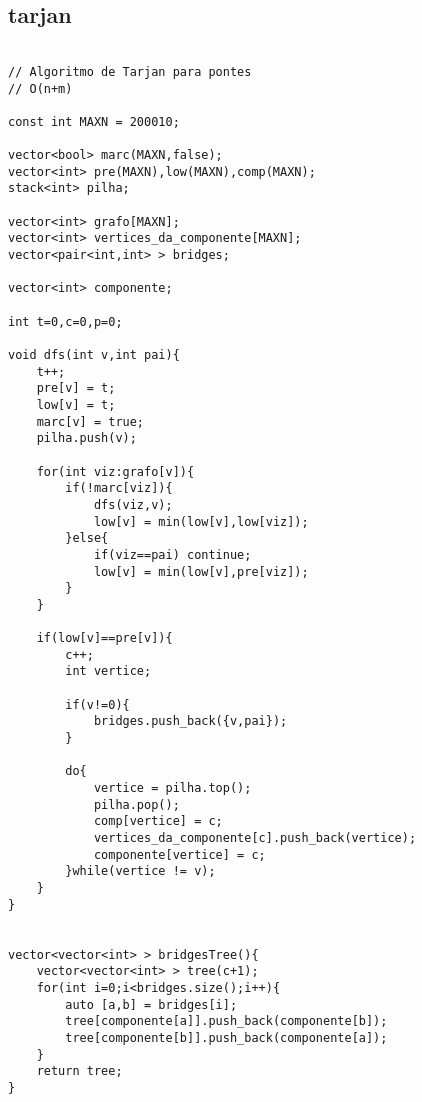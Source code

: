 \documentclass[landscape,twocolumn,10pt,a4paper]{article}
\begin{document}
\subsection{tarjan}
\begin{verbatim}

// Algoritmo de Tarjan para pontes
// O(n+m)

const int MAXN = 200010;

vector<bool> marc(MAXN,false);
vector<int> pre(MAXN),low(MAXN),comp(MAXN);
stack<int> pilha;

vector<int> grafo[MAXN];
vector<int> vertices_da_componente[MAXN];
vector<pair<int,int> > bridges;

vector<int> componente;

int t=0,c=0,p=0;

void dfs(int v,int pai){
    t++;
    pre[v] = t;
    low[v] = t;
    marc[v] = true;
    pilha.push(v);

    for(int viz:grafo[v]){
        if(!marc[viz]){
            dfs(viz,v);
            low[v] = min(low[v],low[viz]);
        }else{
            if(viz==pai) continue;
            low[v] = min(low[v],pre[viz]);
        }
    }

    if(low[v]==pre[v]){
        c++;
        int vertice;

        if(v!=0){
            bridges.push_back({v,pai});
        }

        do{
            vertice = pilha.top();
            pilha.pop();
            comp[vertice] = c;
            vertices_da_componente[c].push_back(vertice);
            componente[vertice] = c;
        }while(vertice != v);
    }
}


vector<vector<int> > bridgesTree(){
    vector<vector<int> > tree(c+1);
    for(int i=0;i<bridges.size();i++){
        auto [a,b] = bridges[i];
        tree[componente[a]].push_back(componente[b]);
        tree[componente[b]].push_back(componente[a]);
    }
    return tree;
}
\end{verbatim}
\end{document}
